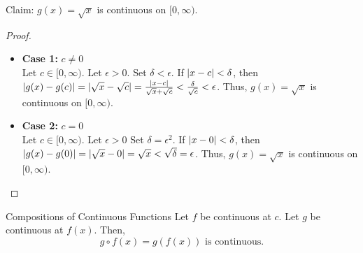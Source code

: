 

Claim: \(g(x) = \sqrt{x}\) is continuous on \([0,\infty)\).

\begin{customframedproof}[linecolor=xgray]
    \begin{proof}
        \begin{itemize}
            \item\hfill \textbf{Case 1:} \(c \ne 0\) \\

            Let \(c \in [0,\infty)\). Let \(\epsilon > 0\). Set \(\delta < \epsilon\). If \(\left|x - c\right| < \delta\), then \(\left|g(x) - g(c)\right| = \left|\sqrt{x} - \sqrt{c}\right| = \frac{\left|x - c\right|}{\sqrt{x} + \sqrt{c}} < \frac{\delta}{\sqrt{c}} < \epsilon\). Thus, \(g(x) = \sqrt{x}\) is continuous on \([0,\infty)\).

            \item \textbf{Case 2:} \(c = 0\) \\

            Let \(c \in [0,\infty)\). Let \(\epsilon > 0\) Set \(\delta = \epsilon^2\). If \(\left|x - 0\right| < \delta\), then \(\left|g(x) - g(0)\right| = \left|\sqrt{x} - 0\right| = \sqrt{x} < \sqrt{\delta} = \epsilon\). Thus, \(g(x) = \sqrt{x}\) is continuous on \([0,\infty)\).
        \end{itemize}
        
    \end{proof}
\end{customframedproof}

\begin{ntheorem}
    {Compositions of Continuous Functions} Let \(f\) be continuous at \(c\). Let \(g\) be continuous at \(f(x)\). Then, 
    \[
    g \circ f(x) = g(f(x)) \text{ is continuous.}
    \]
\end{ntheorem}



